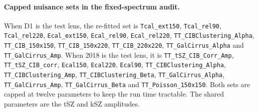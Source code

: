 \documentclass[11pt]{article}
\theoremstyle{remark}
\numberwithin{equation}{section}
\begin{document}
\paragraph{Capped nuisance sets in the fixed-spectrum audit.}
When D1 is the test lens, the re-fitted set is \texttt{Tcal\_\allowbreak{}ext150}, \texttt{Tcal\_\allowbreak{}rel90}, \texttt{Tcal\_\allowbreak{}rel220}, \texttt{Ecal\_\allowbreak{}ext150}, \texttt{Ecal\_\allowbreak{}rel90}, \texttt{Ecal\_\allowbreak{}rel220}, \texttt{TT\_\allowbreak{}CIBClustering\_Alpha}, \texttt{TT\_\allowbreak{}CIB\_150x150}, \texttt{TT\_\allowbreak{}CIB\_150x220}, \texttt{TT\_\allowbreak{}CIB\_220x220}, \texttt{TT\_\allowbreak{}GalCirrus\_Alpha} and \texttt{TT\_\allowbreak{}GalCirrus\_Amp}. When 2018 is the test lens, it is \texttt{TT\_\allowbreak{}tSZ\_CIB\_Corr\_Amp}, \texttt{TT\_\allowbreak{}tSZ\_CIB\_corr}, \texttt{Ecal150}, \texttt{Ecal220}, \texttt{Ecal90}, \texttt{TT\_\allowbreak{}CIBClustering\_Alpha}, \texttt{TT\_\allowbreak{}CIBClustering\_Amp}, \texttt{TT\_\allowbreak{}CIBClustering\_Beta}, \texttt{TT\_\allowbreak{}GalCirrus\_Alpha}, \texttt{TT\_\allowbreak{}GalCirrus\_Amp}, \texttt{TT\_\allowbreak{}GalCirrus\_Beta} and \texttt{TT\_\allowbreak{}Poisson\_150x150}. Both sets are capped at twelve parameters to keep the run time tractable. The shared parameters are the tSZ and kSZ amplitudes.
\end{document}
